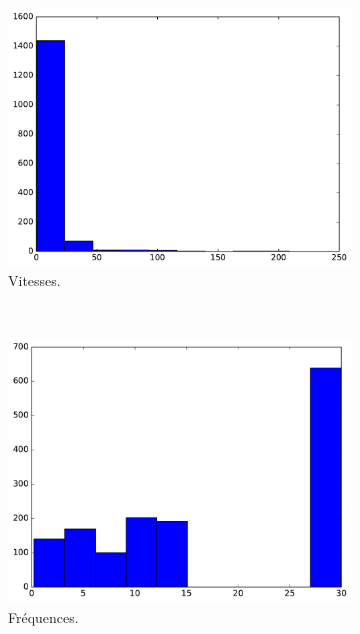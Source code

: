 	\begin{figure}[!htbp]
		\begin{subfigure}[t]{\subImgWclicks}
			\centering
			\includegraphics[width=\textwidth]{figures/ch3/spider_filteredSpeed}
			\caption{Vitesses.}
			\label{fig:spider_filteredSpeed}
		\end{subfigure}
		~
		\begin{subfigure}[t]{\subImgWclicks}
			\centering
			\includegraphics[width=\textwidth]{figures/ch3/spider_frequency}
			\caption{Fréquences.}
			\label{fig:spider_frequency}
		\end{subfigure}
		~
		\begin{subfigure}[t]{\subImgWclicks}
			\centering

\end{subfigure}
\end{figure}
